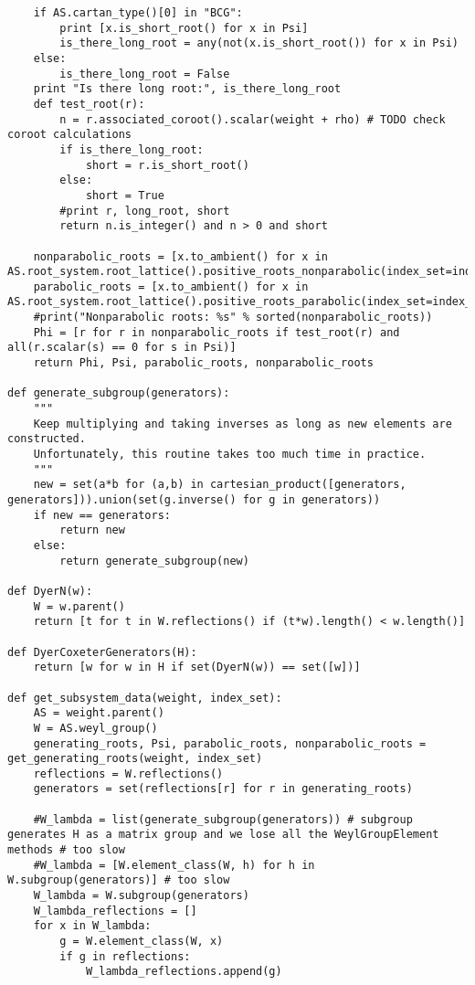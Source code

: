 \begin{verbatim}
    if AS.cartan_type()[0] in "BCG":
        print [x.is_short_root() for x in Psi]
        is_there_long_root = any(not(x.is_short_root()) for x in Psi)
    else:
        is_there_long_root = False
    print "Is there long root:", is_there_long_root
    def test_root(r):
        n = r.associated_coroot().scalar(weight + rho) # TODO check coroot calculations
        if is_there_long_root:
            short = r.is_short_root()
        else:
            short = True
        #print r, long_root, short
        return n.is_integer() and n > 0 and short

    nonparabolic_roots = [x.to_ambient() for x in AS.root_system.root_lattice().positive_roots_nonparabolic(index_set=index_set)]
    parabolic_roots = [x.to_ambient() for x in AS.root_system.root_lattice().positive_roots_parabolic(index_set=index_set)]
    #print("Nonparabolic roots: %s" % sorted(nonparabolic_roots))
    Phi = [r for r in nonparabolic_roots if test_root(r) and all(r.scalar(s) == 0 for s in Psi)]
    return Phi, Psi, parabolic_roots, nonparabolic_roots

def generate_subgroup(generators):
    """
    Keep multiplying and taking inverses as long as new elements are constructed.
    Unfortunately, this routine takes too much time in practice.
    """
    new = set(a*b for (a,b) in cartesian_product([generators, generators])).union(set(g.inverse() for g in generators))
    if new == generators:
        return new
    else:
        return generate_subgroup(new)

def DyerN(w):
    W = w.parent()
    return [t for t in W.reflections() if (t*w).length() < w.length()]

def DyerCoxeterGenerators(H):
    return [w for w in H if set(DyerN(w)) == set([w])]

def get_subsystem_data(weight, index_set):
    AS = weight.parent()
    W = AS.weyl_group()
    generating_roots, Psi, parabolic_roots, nonparabolic_roots =  get_generating_roots(weight, index_set)
    reflections = W.reflections()
    generators = set(reflections[r] for r in generating_roots)

    #W_lambda = list(generate_subgroup(generators)) # subgroup generates H as a matrix group and we lose all the WeylGroupElement methods # too slow
    #W_lambda = [W.element_class(W, h) for h in W.subgroup(generators)] # too slow
    W_lambda = W.subgroup(generators)
    W_lambda_reflections = []
    for x in W_lambda:
        g = W.element_class(W, x)
        if g in reflections:
            W_lambda_reflections.append(g)


\end{verbatim}
